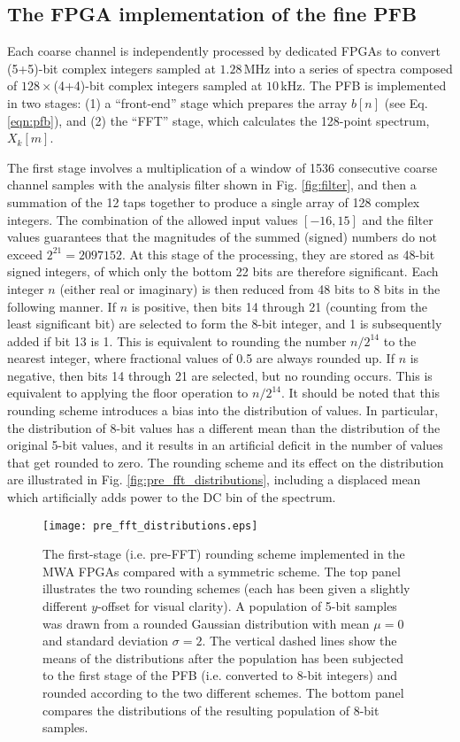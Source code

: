 \documentclass{pasa}%
\begin{document}
\begin{appendix}

\section{The FPGA implementation of the fine PFB}

Each coarse channel is independently processed by dedicated FPGAs to convert (5+5)-bit complex integers sampled at $1.28\,$MHz into a series of spectra composed of $128\times$(4+4)-bit complex integers sampled at $10\,$kHz.
The PFB is implemented in two stages: (1) a ``front-end'' stage which prepares the array $b[n]$ (see Eq. \eqref{eqn:pfb}), and (2) the ``FFT'' stage, which calculates the 128-point spectrum, $X_k[m]$.

The first stage involves a multiplication of a window of 1536 consecutive coarse channel samples with the analysis filter shown in Fig. \ref{fig:filter}, and then a summation of the 12 taps together to produce a single array of 128 complex integers.
The combination of the allowed input values $[-16, 15]$ and the filter values guarantees that the magnitudes of the summed (signed) numbers do not exceed $2^{21} = 2097152$.
At this stage of the processing, they are stored as 48-bit signed integers, of which only the bottom 22 bits are therefore significant.
Each integer $n$ (either real or imaginary) is then reduced from 48 bits to 8 bits in the following manner.
If $n$ is positive, then bits 14 through 21 (counting from the least significant bit) are selected to form the 8-bit integer, and 1 is subsequently added if bit 13 is 1.
This is equivalent to rounding the number $n/2^{14}$ to the nearest integer, where fractional values of 0.5 are always rounded up.
If $n$ is negative, then bits 14 through 21 are selected, but no rounding occurs.
This is equivalent to applying the floor operation to $n/2^{14}$.
It should be noted that this rounding scheme introduces a bias into the distribution of values.
In particular, the distribution of 8-bit values has a different mean than the distribution of the original 5-bit values, and it results in an artificial deficit in the number of values that get rounded to zero.
The rounding scheme and its effect on the distribution are illustrated in Fig. \ref{fig:pre_fft_distributions}, including a displaced mean which artificially adds power to the DC bin of the spectrum.
\begin{figure}[t!]
    \centering
    \texttt{[image: pre\_fft\_distributions.eps]}
    \caption{The first-stage (i.e. pre-FFT) rounding scheme implemented in the MWA FPGAs compared with a symmetric scheme. The top panel illustrates the two rounding schemes (each has been given a slightly different $y$-offset for visual clarity). A population of 5-bit samples was drawn from a rounded Gaussian distribution with mean $\mu = 0$ and standard deviation $\sigma = 2$. The vertical dashed lines show the means of the distributions after the population has been subjected to the first stage of the PFB (i.e. converted to 8-bit integers) and rounded according to the two different schemes. The bottom panel compares the distributions of the resulting population of 8-bit samples.}

\end{figure}
\end{appendix}
\end{document}
